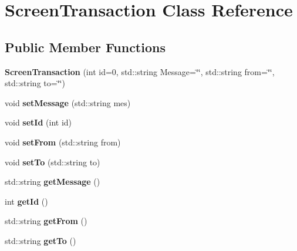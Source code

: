 \hypertarget{class_screen_transaction}{\section{Screen\-Transaction Class Reference}
\label{class_screen_transaction}
}
\subsection*{Public Member Functions}
\begin{DoxyCompactItemize}
\item 
\hypertarget{class_screen_transaction_a5776ea6c2a6b7c7ec51744831e8e63b2}{{\bfseries Screen\-Transaction} (int id=0, std\-::string Message=\char`\"{}\char`\"{}, std\-::string from=\char`\"{}\char`\"{}, std\-::string to=\char`\"{}\char`\"{})}\label{class_screen_transaction_a5776ea6c2a6b7c7ec51744831e8e63b2}

\item 
\hypertarget{class_screen_transaction_a2fde50d60fd9dfefc3f93fdb9fadf0ae}{void {\bfseries set\-Message} (std\-::string mes)}\label{class_screen_transaction_a2fde50d60fd9dfefc3f93fdb9fadf0ae}

\item 
\hypertarget{class_screen_transaction_ae739629ae1f93e5754fc69f1d9ee96f7}{void {\bfseries set\-Id} (int id)}\label{class_screen_transaction_ae739629ae1f93e5754fc69f1d9ee96f7}

\item 
\hypertarget{class_screen_transaction_a5d652df4b9a696dbef724096b782b51e}{void {\bfseries set\-From} (std\-::string from)}\label{class_screen_transaction_a5d652df4b9a696dbef724096b782b51e}

\item 
\hypertarget{class_screen_transaction_aeb8dd00f22a18d66e36453c523fe9d83}{void {\bfseries set\-To} (std\-::string to)}\label{class_screen_transaction_aeb8dd00f22a18d66e36453c523fe9d83}

\item 
\hypertarget{class_screen_transaction_af012c8b10760e5ed7baf2c62846de590}{std\-::string {\bfseries get\-Message} ()}\label{class_screen_transaction_af012c8b10760e5ed7baf2c62846de590}

\item 
\hypertarget{class_screen_transaction_a7a788d3562c6ea040c1a4c0165fdc32a}{int {\bfseries get\-Id} ()}\label{class_screen_transaction_a7a788d3562c6ea040c1a4c0165fdc32a}

\item 
\hypertarget{class_screen_transaction_a6da0ff4e8c5f24c405c18331df6fe5ac}{std\-::string {\bfseries get\-From} ()}\label{class_screen_transaction_a6da0ff4e8c5f24c405c18331df6fe5ac}

\item 
\hypertarget{class_screen_transaction_a5348510109e53a87cb1233660c859e00}{std\-::string {\bfseries get\-To} ()}\label{class_screen_transaction_a5348510109e53a87cb1233660c859e00}

\end{DoxyCompactItemize}
